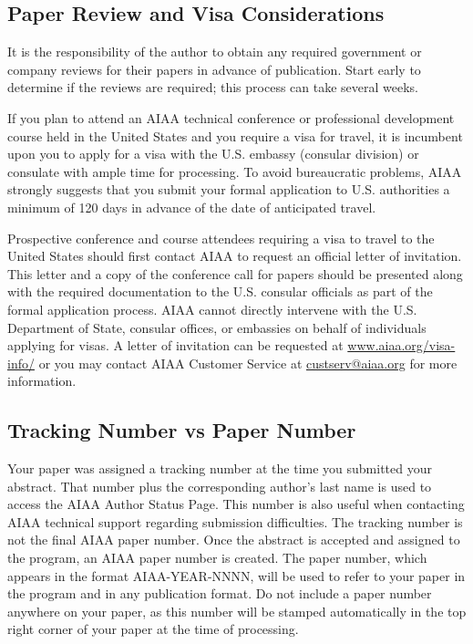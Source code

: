\documentclass{aiaa-tc}%
\begin{document}
\subsection{Paper Review and Visa Considerations}

It is the responsibility of the author to obtain any required government or
company reviews for their papers in advance of publication.
Start early to determine if the reviews are required; this process can
take several weeks.

If you plan to attend an AIAA technical conference or professional
development course held in the United States and you require a visa for
travel, it is incumbent upon you to apply for a visa with the
U.S. embassy (consular division) or consulate with ample time for
processing.
To avoid bureaucratic problems, AIAA strongly suggests that you submit
your formal application to U.S. authorities a minimum of 120 days in
advance of the date of anticipated travel.

Prospective conference and course attendees requiring a visa to travel
to the United States should first contact AIAA to request an official
letter of invitation.
This letter and a copy of the conference call for papers should be presented
along with the required documentation to the U.S. consular officials as part of
the formal application process.
AIAA cannot directly intervene with the U.S. Department of State,
consular offices, or embassies on behalf of individuals applying for visas.
A letter of invitation can be requested at
\href{http://www.aiaa.org/visa-info/}{www.aiaa.org/visa-info/} or you
may contact AIAA Customer Service at
\href{mailto:custserv@aiaa.org?subject=visa}{custserv@aiaa.org} for more
information.

\subsection{Tracking Number vs Paper Number}

Your paper was assigned a tracking number at the time you submitted
your abstract.
That number plus the corresponding author's last name is used to access
the AIAA Author Status Page.
This number is also useful when contacting AIAA technical support
regarding submission difficulties.
The tracking number is not the final AIAA paper number.
Once the abstract is accepted and assigned to the program, an AIAA
paper number is created.
The paper number, which appears in the format
{\footnotesize\textsf{AIAA-YEAR-NNNN}}, will be used to refer to your
paper in the program and in any publication format.
Do not include a paper number anywhere on your paper, as this number
will be stamped automatically in the top right corner of your paper at
the time of processing.
\end{document}
